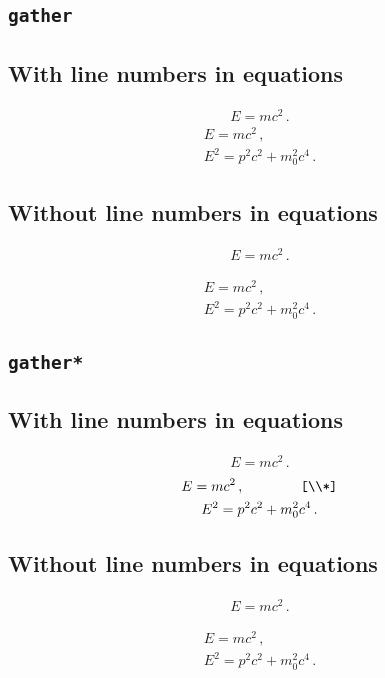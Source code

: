 \documentclass{ltxdoc}
\begin{document}
\subsection*{\texttt{gather}}

\subsection*{With line numbers in equations}
\nextlipsum
\begin{gather}
  E = m c^2 \,.
\end{gather}
\nextlipsum
\begin{gather}
  E = m c^2 \,, \\
  E^2 = p^2 c^2 + m_0^2 c^4 \,.
\end{gather}
\nextlipsum

\subsection*{Without line numbers in equations}
\nextlipsum
\begin{linenomath*}
\begin{gather}
  E = m c^2 \,.
\end{gather}
\end{linenomath*}
\nextlipsum
\begin{linenomath*}
\begin{gather}
  E = m c^2 \,, \\
  E^2 = p^2 c^2 + m_0^2 c^4 \,.
\end{gather}
\end{linenomath*}
\nextlipsum

\subsection*{\texttt{gather*}}

\subsection*{With line numbers in equations}
\nextlipsum
\begin{gather*}
  E = m c^2 \,.
\end{gather*}
\nextlipsum
\begin{gather*}
  E = m c^2 \,, \qquad\qquad\texttt{[\textbackslash\textbackslash{}*]}\\*
  E^2 = p^2 c^2 + m_0^2 c^4 \,.
\end{gather*}
\nextlipsum

\subsection*{Without line numbers in equations}
\nextlipsum
\begin{linenomath*}
\begin{gather*}
  E = m c^2 \,.
\end{gather*}
\end{linenomath*}
\nextlipsum
\begin{linenomath*}
\begin{gather*}
  E = m c^2 \,, \\
  E^2 = p^2 c^2 + m_0^2 c^4 \,.
\end{gather*}
\end{linenomath*}
\nextlipsum
\end{document}
